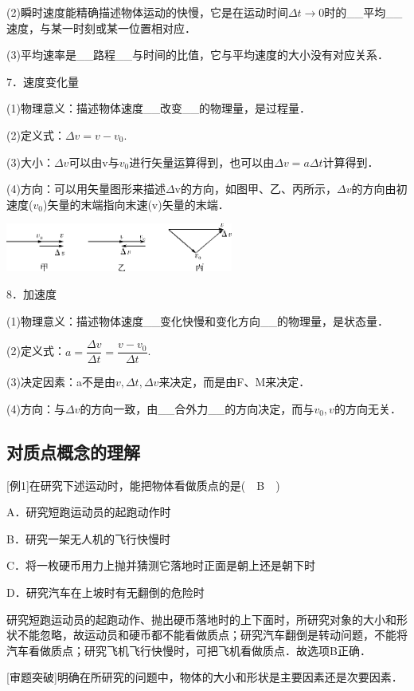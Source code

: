 (2)瞬时速度能精确描述物体运动的快慢，它是在运动时间$\Delta t \rightarrow 0$时的\_\_平均\_\_速度，与某一时刻或某一位置相对应．

(3)平均速率是\_\_路程\_\_与时间的比值，它与平均速度的大小没有对应关系．

7．速度变化量

(1)物理意义：描述物体速度\_\_改变\_\_的物理量，是过程量．

(2)定义式：$\Delta v=v-v_{0}$.

(3)大小：$\Delta v$可以由v与$v_{0}$进行矢量运算得到，也可以由$\Delta v=a \Delta t$计算得到．

(4)方向：可以用矢量图形来描述$\Delta$v的方向，如图甲、乙、丙所示，$\Delta v$的方向由初速度($v_{0}$)矢量的末端指向末速(v)矢量的末端．

\begin{center}\includegraphics[width=2.94792in,height=0.625in]{media/image5.png}\end{center}
8．加速度

(1)物理意义：描述物体速度\_\_变化快慢和变化方向\_\_的物理量，是状态量．

(2)定义式：$a=\dfrac{\Delta v}{\Delta t}=\dfrac{v-v_{0}}{\Delta t}$.

(3)决定因素：a不是由$v, \Delta t, \Delta v$来决定，而是由F、M来决定．

(4)方向：与$\Delta v$的方向一致，由\_\_合外力\_\_的方向决定，而与$v_{0},v$的方向无关．

\newpage
\subsection{对质点概念的理解}
{[}例1{]}在研究下述运动时，能把物体看做质点的是(　B　)

A．研究短跑运动员的起跑动作时

B．研究一架无人机的飞行快慢时

C．将一枚硬币用力上抛并猜测它落地时正面是朝上还是朝下时

D．研究汽车在上坡时有无翻倒的危险时
\begin{solution}
	研究短跑运动员的起跑动作、抛出硬币落地时的上下面时，所研究对象的大小和形状不能忽略，故运动员和硬币都不能看做质点；研究汽车翻倒是转动问题，不能将汽车看做质点；研究飞机飞行快慢时，可把飞机看做质点．故选项B正确．
	
	{[}审题突破{]}明确在所研究的问题中，物体的大小和形状是主要因素还是次要因素．
\end{solution}



